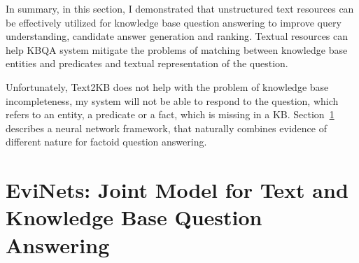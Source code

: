 
In summary, in this section, I demonstrated that unstructured text resources can be effectively utilized for knowledge base question answering to improve query understanding, candidate answer generation and ranking.
Textual resources can help KBQA system mitigate the problems of matching between knowledge base entities and predicates and textual representation of the question.

Unfortunately, Text2KB does not help with the problem of knowledge base incompleteness, \ie my system will not be able to respond to the question, which refers to an entity, a predicate or a fact, which is missing in a KB.
Section~\ref{section:factoid:evinets} describes a neural network framework, that naturally combines evidence of different nature for factoid question answering.



\section{EviNets: Joint Model for Text and Knowledge Base Question Answering}
\label{section:factoid:evinets}


